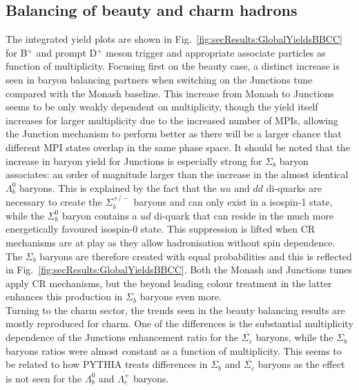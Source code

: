 \subsection{Balancing of beauty and charm hadrons}
\label{sec:results:balancing}
The integrated yield plots are shown in Fig.~\ref{fig:secResults:GlobalYieldsBBCC} for B$^{+}$ and prompt D$^{+}$ meson trigger and appropriate associate particles as function of multiplicity. Focusing first on the beauty case, a distinct increase is seen in baryon balancing partners when switching on the Junctions tune compared with the Monash baseline. This increase from Monash to Junctions seems to be only weakly dependent on multiplicity, though the yield itself increases for larger multiplicity due to the increased number of MPIs, allowing the Junction mechanism to perform better as there will be a larger chance that different MPI states overlap in the same phase space. It should be noted that the increase in baryon yield for Junctions is especially strong for $\Sigma_{b}$ baryon associates: an order of magnitude larger than the increase in the almost identical $\Lambda^{0}_{b}$ baryons. This is explained by the fact that the $uu$ and $dd$ di-quarks are necessary to create the $\Sigma_{b}^{+/-}$ baryons and can only exist in a isospin-1 state, while the $\Sigma_{b}^{0}$ baryon contains a $ud$ di-quark that can reside in the much more energetically favoured isospin-0 state. This suppression is lifted when CR mechanisms are at play as they allow hadronisation without spin dependence. The $\Sigma_{b}$ baryons are therefore created with equal probabilities and this is reflected in Fig.~\ref{fig:secResults:GlobalYieldsBBCC}. Both the Monash and Junctions tunes apply CR mechanisms, but the beyond leading colour treatment in the latter enhances this production in $\Sigma_{b}$ baryons even more. \\
\indent Turning to the charm sector, the trends seen in the beauty balancing results are mostly reproduced for charm. One of the differences is the substantial multiplicity dependence of the Junctions enhancement ratio for the $\overline{\Sigma_{c}}$ baryons, while the $\Sigma_{b}$ baryons ratios were almost constant as a function of multiplicity. This seems to be related to how PYTHIA treats differences in $\Sigma_{b}$ and $\overline{\Sigma_{c}}$ baryons as the effect is not seen for the $\Lambda^{0}_{b}$ and $\overline{\Lambda^{+}_{c}}$ baryons. \\

